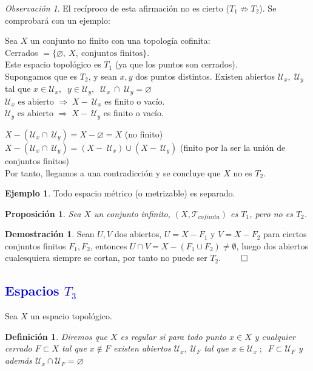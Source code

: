 \documentclass[12pt,twoside]{report}
\newcommand\mc[1]{\mathcal{#1}}
\theoremstyle{azul}
\newtheorem*{defix}{Definición}
\theoremstyle{azul2}
\theoremstyle{plain}
\newtheorem*{prop}{Proposición}
\theoremstyle{definition}
\newtheorem*{eje}{Ejemplo}
\newtheorem*{dem}{Demostración}
\theoremstyle{remark}
\newtheorem*{obs}{Observación}
\begin{document}
\begin{obs}
El recíproco de esta afirmación no es cierto ($T_1 \not\Rightarrow T_2$). Se comprobará con un ejemplo:

Sea $X$ un conjunto no finito con una topología cofinita: \\
Cerrados $= \{\varnothing,\: X, \: \text{conjuntos finitos}\}$. \\
Este espacio topológico es $T_1$ (ya que los puntos son cerrados).\\
Supongamos que es $T_2$, y sean $x, y$ dos puntos distintos. Existen abiertos $\mathcal{U}_x, \; \mathcal{U}_y$ tal que $x \in \mathcal{U}_x , \;\; y \in \mathcal{U}_y , \;\; \mathcal{U}_x \: \cap \; \mathcal{U}_y = \varnothing$\\
$\mathcal{U}_x \text{ es abierto } \Rightarrow \; X - \: \mathcal{U}_x$ es finito o vacío.\\
$\mathcal{U}_y \text{ es abierto } \Rightarrow \; X - \: \mathcal{U}_y$ es finito o vacío.

$X - (\mathcal{U}_x \cap \: \mathcal{U}_y) = X - \varnothing = X$ (no finito)\\
$X - (\mathcal{U}_x \cap \: \mathcal{U}_y) = (X - \: \mathcal{U}_x) \cup (X - \: \mathcal{U}_y)$ (finito por la ser la unión de conjuntos finitos)\\
Por tanto, llegamos a una contradicción y se concluye que $X$ no es $T_2$.
\end{obs}
\begin{eje}
     Todo espacio métrico (o metrizable) es separado.
\end{eje}
\begin{prop}
 Sea $X$ un conjunto infinito, $(X, \mc{T}_{cofinita})$ es $T_1$, pero no es $T_2$.  
\end{prop}
\begin{dem}
Sean $U, V$ dos abiertos, $U=X-F_1$ y $V=X-F_2$ para ciertos conjuntos finitos $F_1,F_2$, entonces $U \cap V = X - (F_1 \cup F_2) \neq \emptyset$, luego dos abiertos cualesquiera siempre se cortan, por tanto no puede ser $T_2$. \hfill $\qed$
\end{dem}
\vspace{-17mm}

\textcolor{blue}{\section{Espacios $T_3$}}
Sea $X$ un espacio topológico.
\begin{defix}
Diremos que $X$ es regular si para todo punto $x \in X$ y cualquier cerrado $F \subset X$ tal que $x \not\in F$ existen abiertos $\mc{U}_x, \; \mc{U}_F$ tal que $x \in \mc{U}_x\; ; \;\; F \subset \mc{U}_F$ y además $\mc{U}_x \cap \mc{U}_F = \varnothing$
\end{defix}
\end{document}
